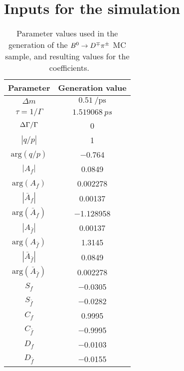 \section[Inputs for the $\Bz\to\Dmp\pipm$ simulation]{Inputs for the \boldmath{$\Bz\to\Dmp\pipm$} simulation}
\label{app:mcgen}

\begin{table}[htbp]
  \begin{center}
    \caption{Parameter values used in the generation of the $\Bz\to\Dmp\pipm$
    MC sample, and resulting values for the \CP~coefficients.}
    \begin{tabular}{cc}
    Parameter & Generation value \\
\toprule
$\Delta m$ & $\SI{0.51}{\per\pico\second}$ \\
$\tau=1/\Gamma$ & $\SI{1.519068}{ps}$ \\
$\Delta\Gamma/\Gamma$ & \num{0} \\
$\left|q/p\right|$ & \num{1} \\
$\text{arg}\!\left(q/p\right)$ & \num{-0.764} \\
$\left|A_{f}\right|$ & \num{0.0849} \\
$\text{arg}\!\left(A_{f}\right)$ & \num{0.002278} \\
$\left|\bar A_{f}\right|$ & \num{0.00137} \\
$\text{arg}\!\left(\bar A_{f}\right)$ & \num{-1.128958} \\
$\left|A_{\bar f}\right|$ & \num{0.00137} \\
$\text{arg}\!\left(A_{\bar f}\right)$ & \num{1.3145} \\
$\left|\bar A_{\bar f}\right|$ & \num{0.0849} \\
$\text{arg}\!\left(\bar A_{\bar f}\right)$ & \num{0.002278} \\
\midrule
$S_{f}$ & \num{-0.0305} \\
$S_{\bar f}$ & \num{-0.0282} \\
$C_{f}$ & \num{0.9995} \\
$C_{\bar f}$ & \num{-0.9995} \\
$D_{f}$ & \num{-0.0103} \\
$D_{\bar f}$ & \num{-0.0155} \\
\bottomrule
    \end{tabular}
    \label{tab:MCgen}
  \end{center}
\end{table}
